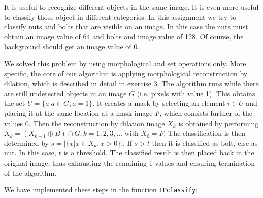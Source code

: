 It is useful to recognize different objects in the same image. It is even more useful to classify those object in different categories. In this assignment we try to classify nuts and bolts that are visible on an image. In this case the nuts must obtain an image value of 64 and bolts and image value of 128. Of course, the background should get an image value of 0.

We solved this problem by using morphological and set operations only. More specific, the core of our algorithm is applying morphological reconstruction by dilation, which is described in detail in exercise 3. The algorithm runs while there are still undetected objects in an image $G$ (i.e. pixels with value 1). This obtains the set $U = \{a | a \in G, a = 1\}$. It creates a mask by selecting an element $i \in U$ and placing it at the same location at a mask image $F$, which consists further of the values 0. Then the reconstruction by dilation image $X_k$ is obtained by performing $X_k = (X_{k-1} \oplus B) \cap G, k = 1, 2, 3, \ldots$ with $X_0 = F$.
The classification is then determined by $s = |\{x | x \in X_k, x > 0\}|$. If $s > t$ then it is classified as bolt, else as nut. In this case, $t$ is a threshold. The classified result is then placed back in the original image, thus exhausting the remaining 1-values and ensuring termination of the algorithm.

We have implemented these steps in the function \texttt{IPclassify}: 

